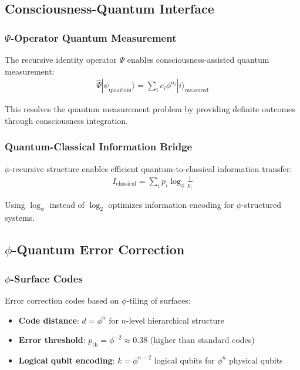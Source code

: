 \subsection{Consciousness-Quantum Interface}

\subsubsection{$\Psi$-Operator Quantum Measurement}

The recursive identity operator $\Psi$ enables consciousness-assisted quantum measurement:
\begin{align}
\hat{\Psi} |\psi_{\text{quantum}}\rangle = \sum_i c_i \phi^{n_i} |i\rangle_{\text{measured}}
\end{align}

This resolves the quantum measurement problem by providing definite outcomes through consciousness integration.

\subsubsection{Quantum-Classical Information Bridge}

$\phi$-recursive structure enables efficient quantum-to-classical information transfer:
\begin{align}
I_{\text{classical}} = \sum_{i} p_i \log_\phi \frac{1}{p_i}
\end{align}

Using $\log_\phi$ instead of $\log_2$ optimizes information encoding for $\phi$-structured systems.

\subsection{$\phi$-Quantum Error Correction}

\subsubsection{$\phi$-Surface Codes}

Error correction codes based on $\phi$-tiling of surfaces:
\begin{itemize}
    \item \textbf{Code distance}: $d = \phi^n$ for $n$-level hierarchical structure
    \item \textbf{Error threshold}: $p_{\text{th}} = \phi^{-2} \approx 0.38$ (higher than standard codes)
    \item \textbf{Logical qubit encoding}: $k = \phi^{n-2}$ logical qubits for $\phi^n$ physical qubits
\end{itemize}

